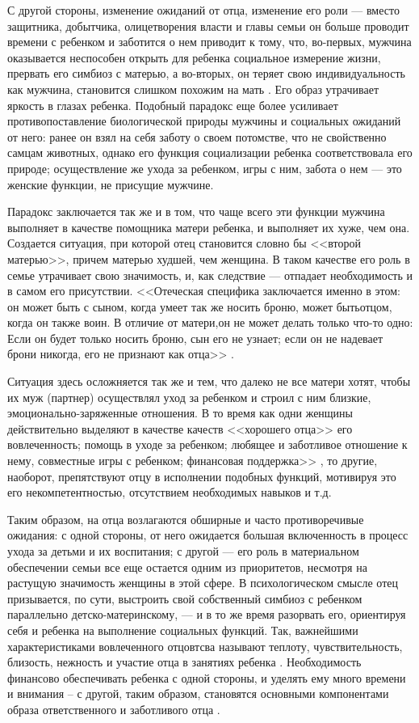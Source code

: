 \documentclass{../../common/thesisbyxetex}
\begin{document}
С другой стороны, изменение ожиданий от отца, изменение его роли --- вместо защитника, добытчика,
олицетворения власти и главы семьи он больше проводит времени с ребенком и заботится о нем
приводит к тому, что, во-первых, мужчина оказывается неспособен открыть для ребенка социальное
измерение жизни, прервать его симбиоз с матерью, а во-вторых, он теряет свою индивидуальность как
мужчина, становится слишком похожим на мать \cite[285]{zo}. Его образ утрачивает
яркость в глазах ребенка. Подобный парадокс еще более усиливает противопоставление биологической
природы мужчины и социальных ожиданий от него: ранее он взял на себя заботу о своем потомстве, что
не свойственно самцам животных, однако его функция социализации ребенка соответствовала его
природе; осуществление же ухода за ребенком, игры  с ним, забота о нем --- это женские функции, не
присущие мужчине.

Парадокс заключается так же и в том, что чаще всего эти функции мужчина выполняет в качестве
помощника матери ребенка, и выполняет их хуже, чем она. Создается ситуация, при
которой отец становится словно бы <<второй матерью>>, причем матерью худшей, чем женщина. В таком
качестве его роль в семье утрачивает свою значимость, и, как следствие --- отпадает
необходимость и в самом его присутствии. <<Отеческая специфика заключается именно в этом: он может
быть с сыном, когда умеет так же носить
броню, может бытьотцом, когда он также воин. В отличие от матери,он не может делать только
что-то одно: Если он будет только носить броню, сын его не узнает; если он не надевает брони
никогда, его не признают как отца>> \cite[287]{zo}.

Ситуация здесь осложняется так же и тем, что далеко не все матери хотят, чтобы их муж (партнер)
осуществлял уход за ребенком и строил с ним близкие, эмоционально-заряженные отношения. В то время
как одни женщины действительно выделяют в качестве качеств <<хорошего отца>>  его вовлеченность;
помощь в уходе за ребенком; любящее и
заботливое отношение к нему, совместные игры с ребенком; финансовая поддержка>> \cite[137]{money},
то другие, наоборот, препятствуют отцу в исполнении подобных функций, мотивируя это его
некомпетентностью, отсутствием необходимых навыков и т.д.


Таким образом, на отца возлагаются обширные и часто противоречивые ожидания: с одной стороны, от
него ожидается большая включенность в процесс ухода за детьми и их воспитания; с другой --- его
роль в материальном обеспечении семьи все еще остается одним из приоритетов, несмотря на растущую
значимость женщины в этой сфере. В психологическом смысле отец призывается, по сути, выстроить свой
собственный симбиоз с ребенком параллельно детско-материнскому, --- и в то же время разорвать его,
ориентируя себя и ребенка на выполнение социальных функций. Так, важнейшими характеристиками
вовлеченного отцовтсва называют теплоту, чувствительность, близость, нежность и участие отца в
занятиях ребенка \cite[129]{f21}.
Необходимость финансово обеспечивать ребенка с одной стороны, и уделять ему много времени и
внимания -- с другой, таким образом, становятся основными компонентами образа ответственного и
заботливого отца \cite[129]{f21}.
\end{document}
